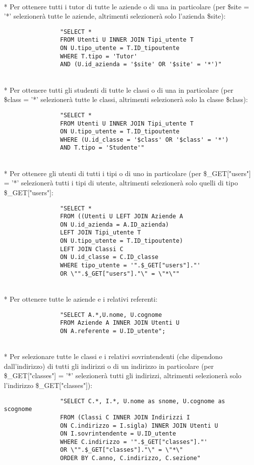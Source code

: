 \documentclass[12pt]{article}
\begin{document}
\\*
\noindent
Per ottenere tutti i tutor di tutte le aziende o di una in particolare (per \$site = '*' selezionerà tutte le aziende, altrimenti selezionerà solo l'azienda \$site):
\begin{verbatim}
                "SELECT *
                FROM Utenti U INNER JOIN Tipi_utente T
                ON U.tipo_utente = T.ID_tipoutente
                WHERE T.tipo = 'Tutor'
                AND (U.id_azienda = '$site' OR '$site' = '*')"
\end{verbatim}

\\*
\noindent
Per ottenere tutti gli studenti di tutte le classi o di una in particolare (per \$class = '*' selezionerà tutte le classi, altrimenti selezionerà solo la classe \$class):
\begin{verbatim}
                "SELECT * 
                FROM Utenti U INNER JOIN Tipi_utente T
                ON U.tipo_utente = T.ID_tipoutente
                WHERE (U.id_classe = '$class' OR '$class' = '*')
                AND T.tipo = 'Studente'"
\end{verbatim}

\\*
\noindent
Per ottenere gli utenti di tutti i tipi o di uno in particolare (per \$\_GET["users"] = '*' selezionerà tutti i tipi di utente, altrimenti selezionerà solo quelli di tipo \$\_GET["users"]:
\begin{verbatim}
                "SELECT *
                FROM ((Utenti U LEFT JOIN Aziende A
                ON U.id_azienda = A.ID_azienda) 
                LEFT JOIN Tipi_utente T
                ON U.tipo_utente = T.ID_tipoutente)
                LEFT JOIN Classi C
                ON U.id_classe = C.ID_classe
                WHERE tipo_utente = '".$_GET["users"]."'
                OR \"".$_GET["users"]."\" = \"*\""
\end{verbatim}

\\*
\noindent
Per ottenere tutte le aziende e i relativi referenti:
\begin{verbatim}
                "SELECT A.*,U.nome, U.cognome
                FROM Aziende A INNER JOIN Utenti U
                ON A.referente = U.ID_utente";
\end{verbatim}

\\*
\noindent
Per selezionare tutte le classi e i relativi sovrintendenti (che dipendono dall'indirizzo) di tutti gli indirizzi o di un indirizzo in particolare (per \$\_GET["classes"] = '*' selezionerà tutti gli indirizzi, altrimenti selezionerà solo l'indirizzo \$\_GET["classes"]):
\begin{verbatim}
                "SELECT C.*, I.*, U.nome as snome, U.cognome as scognome
                FROM (Classi C INNER JOIN Indirizzi I
                ON C.indirizzo = I.sigla) INNER JOIN Utenti U
                ON I.sovrintendente = U.ID_utente
                WHERE C.indirizzo = '".$_GET["classes"]."'
                OR \"".$_GET["classes"]."\" = \"*\"
                ORDER BY C.anno, C.indirizzo, C.sezione"
\end{verbatim}
\end{document}

